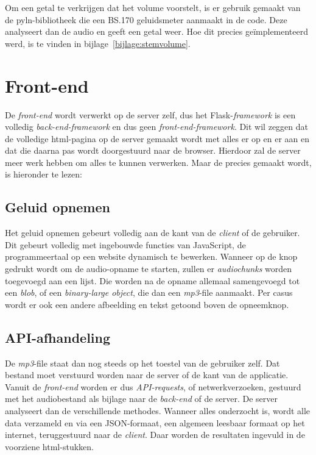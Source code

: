 Om een getal te verkrijgen dat het volume voorstelt, is er gebruik gemaakt van de pyln-bibliotheek die een BS.170 geluidsmeter aanmaakt in de code. Deze analyseert dan de audio en geeft een getal weer. Hoe dit precies geïmplementeerd werd, is te vinden in bijlage~\ref{bijlage:stemvolume}.

\section{Front-end}
De \textit{front-end} wordt verwerkt op de server zelf, dus het Flask-\textit{framework} is een volledig \textit{back-end-framework} en dus geen \textit{front-end-framework}. Dit wil zeggen dat de volledige html-pagina op de server gemaakt wordt met alles er op en er aan en dat die daarna pas wordt doorgestuurd naar de browser. Hierdoor zal de server meer werk hebben om alles te kunnen verwerken. Maar de  precies gemaakt wordt, is hieronder te lezen:

\subsection{Geluid opnemen}
Het geluid opnemen gebeurt volledig aan de kant van de \textit{client} of de gebruiker. Dit gebeurt volledig met ingebouwde functies van JavaScript, de programmeertaal op een website dynamisch te bewerken. Wanneer op de knop gedrukt wordt om de audio-opname te starten, zullen er \textit{audiochunks } worden toegevoegd aan een lijst. Die worden na de opname allemaal samengevoegd tot een \textit{blob}, of een \textit{binary-large object}, die dan een \textit{mp3}-file aanmaakt.
Per casus wordt er ook een andere afbeelding en tekst getoond boven de opneemknop.

\subsection{API-afhandeling}
De \textit{mp3}-file staat dan nog steeds op het toestel van de gebruiker zelf. Dat bestand moet verstuurd worden naar de server of de  kant van de applicatie.
Vanuit de \textit{front-end} worden er dus \textit{API-requests}, of netwerkverzoeken, gestuurd met het audiobestand als bijlage naar de \textit{back-end} of de server. De server analyseert dan de verschillende methodes. Wanneer alles onderzocht is, wordt alle data verzameld en via een JSON-formaat, een algemeen leesbaar formaat op het internet, teruggestuurd naar de \textit{client}. Daar worden de resultaten ingevuld in de voorziene html-stukken.


